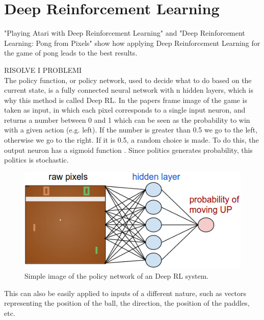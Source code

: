 \section{Deep Reinforcement Learning}

"Playing Atari with Deep Reinforcement Learning" \cite{mnih2013playing} and "Deep Reinforcement Learning: Pong from Pixels" \cite{karpathy2016deep} show how applying Deep Reinforcement Learning for the game of pong leads to the best results.

RISOLVE I PROBLEMI\\

The policy function, or policy network, used to decide what to do based on the current state, is a fully connected neural network with n hidden layers, which is why this method is called Deep RL. In the papers frame image of the game is taken as input, in which each pixel corresponds to a single input neuron, and returns a number between 0 and 1 which can be seen as the probability to win with a given action (e.g. left). If the number is greater than 0.5 we go to the left, otherwise we go to the right. If it is 0.5, a random choice is made. To do this, the output neuron has a sigmoid function \cite{mnih2013playing}\cite{karpathy2016deep}.
Since politics generates probability, this politics is stochastic.

\begin{figure}[ht]
    \centering
    \includegraphics[scale=0.4]{images/DRL_network.png}
    \caption{Simple image of the policy network of an Deep RL system.}
    \label{fig:DRL_network}
\end{figure}

This can also be easily applied to inputs of a different nature, such as vectors representing the position of the ball, the direction, the position of the paddles, etc.